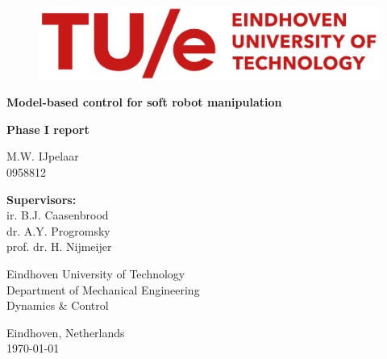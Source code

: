 
\begin{titlepage}
\vspace*{10mm}

          \begin{figure}[H]
                \centering
              \includegraphics[width=0.9\linewidth]{TitlePage/TUe-logo-descriptor-line-scarlet-L.png}
          \end{figure}

\begin{center}


\vspace*{15mm}

    \Huge
    \textbf{Model-based control for soft robot manipulation\\}
    
    
\vspace*{10mm}

\Large 
\textbf{Phase I report}
    
\vspace*{10mm}   
    \Large
    {M.W. IJpelaar} \\
    {0958812}
    
    
\vspace*{1.5cm}
\large
 \textbf{Supervisors:}   \\
    ir. B.J. Caasenbrood   \\
    dr. A.Y. Progromsky  \\
    prof. dr. H. Nijmeijer   \\

\vspace*{15mm}

\end{center}

\begin{flushleft}
Eindhoven University of Technology \\
Department of Mechanical Engineering \\
Dynamics \& Control
 
 
\vspace*{10mm} 


Eindhoven, Netherlands\\
\today \\
\end{flushleft}
	
	
\end{titlepage}